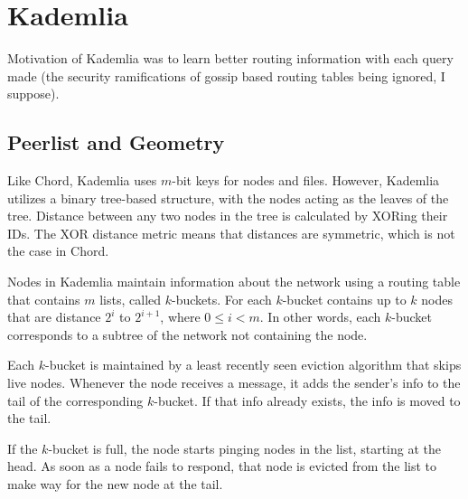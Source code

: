 \documentclass[10pt,letterpaper,twoside]{report}
\begin{document}





\section{Kademlia}
\cite{kademlia}
Motivation of Kademlia was to learn better routing information with each query made (the security ramifications of gossip based routing tables being ignored, I suppose).

\subsection*{Peerlist and Geometry}
Like Chord, Kademlia uses $m$-bit keys for nodes and files.
However, Kademlia utilizes a binary tree-based structure, with the nodes acting as the leaves of the tree.
Distance between any two nodes in the tree  is calculated by XORing their IDs.
The XOR distance metric means that distances are symmetric, which is not the case in Chord.


Nodes in Kademlia maintain information about the network using a routing table that contains  $m$ lists, called $k$-buckets.
For each $k$-bucket contains up to $k$ nodes that are distance $2^i$ to $2^{i+1}$, where $0 \leq i < m$.
In other words, each $k$-bucket corresponds to a subtree of the network not containing the node.

Each $k$-bucket is maintained by a least recently seen eviction algorithm that skips live nodes.
Whenever the node receives a message, it adds the sender's info to the tail of the corresponding $k$-bucket.
If that info already exists, the info is moved to the tail.

If the $k$-bucket is full, the node starts pinging nodes in the list, starting at the head.
As soon as a node fails to respond, that node is evicted from the list to make way for the new node at the tail.
\end{document}
